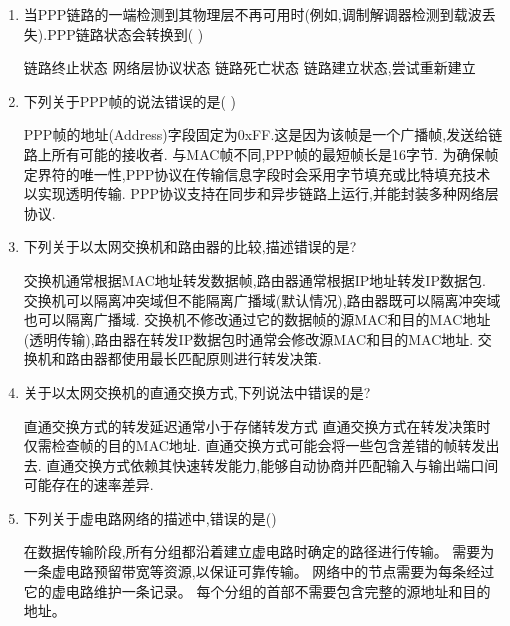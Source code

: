 \documentclass[12pt, a4paper, oneside, UTF8]{ctexbook}
\begin{document}
\begin{enumerate}
    \item  当PPP链路的一端检测到其物理层不再可用时(例如,调制解调器检测到载波丢失).PPP链路状态会转换到( )
    \begin{choices}[1]
    \task 链路终止状态
    \task 网络层协议状态
    \task 链路死亡状态
    \task 链路建立状态,尝试重新建立
    \end{choices}

    \item 下列关于PPP帧的说法错误的是( )
    \begin{choices}[1]
    \task PPP帧的地址(Address)字段固定为0xFF.这是因为该帧是一个广播帧,发送给链路上所有可能的接收者.
    \task 与MAC帧不同,PPP帧的最短帧长是16字节.
    \task 为确保帧定界符的唯一性,PPP协议在传输信息字段时会采用字节填充或比特填充技术以实现透明传输.
    \task PPP协议支持在同步和异步链路上运行,并能封装多种网络层协议.
    \end{choices}

    \item 下列关于以太网交换机和路由器的比较,描述错误的是?
    \begin{choices}[1]
    \task 交换机通常根据MAC地址转发数据帧,路由器通常根据IP地址转发IP数据包.
    \task 交换机可以隔离冲突域但不能隔离广播域(默认情况),路由器既可以隔离冲突域也可以隔离广播域.
    \task 交换机不修改通过它的数据帧的源MAC和目的MAC地址(透明传输),路由器在转发IP数据包时通常会修改源MAC和目的MAC地址.
    \task 交换机和路由器都使用最长匹配原则进行转发决策.
    \end{choices}

    \item 关于以太网交换机的直通交换方式,下列说法中错误的是?
    \begin{choices}[1]
    \task 直通交换方式的转发延迟通常小于存储转发方式
    \task 直通交换方式在转发决策时仅需检查帧的目的MAC地址.
    \task 直通交换方式可能会将一些包含差错的帧转发出去.
    \task 直通交换方式依赖其快速转发能力,能够自动协商并匹配输入与输出端口间可能存在的速率差异.
    \end{choices}

    \item 下列关于虚电路网络的描述中,错误的是(\qquad)
    \begin{choices}[1]
    \task 在数据传输阶段,所有分组都沿着建立虚电路时确定的路径进行传输。
    \task 需要为一条虚电路预留带宽等资源,以保证可靠传输。
    \task 网络中的节点需要为每条经过它的虚电路维护一条记录。
    \task 每个分组的首部不需要包含完整的源地址和目的地址。
    \end{choices}


\end{enumerate}
\end{document}
